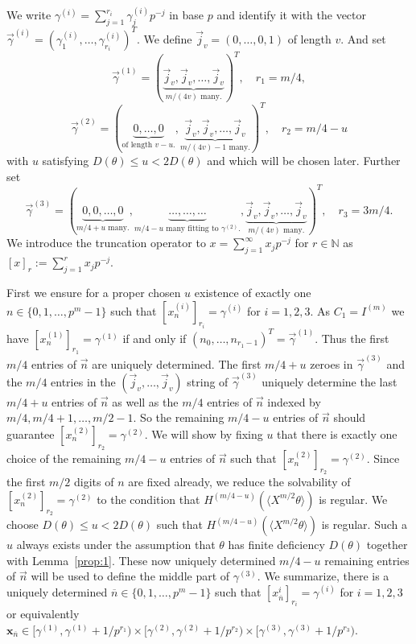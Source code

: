 \documentclass{article}
\newcommand{\bsx}{\boldsymbol{x}}%
\newcommand{\NN}{\mathbb N}
\renewcommand{\(}{\left (}
\renewcommand{\)}{\right )}
\theoremstyle{definition}
\numberwithin{equation}{section}
\begin{document}
We write $\gamma^{(i)}=\sum_{j=1}^{r_i}\gamma_j^{(i)}p^{-j}$ in base $p$ and identify it with the vector $\vec \gamma^{(i)}=(\gamma^{(i)}_1,\ldots,\gamma^{(i)}_{r_i})^T$. 
We define $\vec{j}_v=(0,\ldots,0,1)$ of length $v$. And set 
$$\vec \gamma^{(1)}=(\underbrace{\vec{j}_v,\vec{j}_v,\ldots,\vec{j}_v}_{\mbox{$m/(4v)$ many.}})^T,\quad r_1=m/4,$$
$$\vec \gamma^{(2)}=(\underbrace{0,\ldots,0}_{\mbox{of length $v-u$.}},\underbrace{\vec{j}_v,\vec{j}_v,\ldots,\vec{j}_v}_{\mbox{$m/(4v)-1$ many.}})^T,\quad r_2=m/4-u$$
with $u$ satisfying $D(\theta)\leq u < 2D(\theta)$ and which will be chosen later. Further set 
$$\vec \gamma^{(3)}=(\underbrace{0,0,\ldots,0}_{\mbox{$m/4+u$ many.}},\underbrace{\ldots,\ldots,\ldots}_{\mbox{$m/4-u$ many fitting to $\gamma^{(2)}$.}},\underbrace{\vec{j}_v,\vec{j}_v,\ldots,\vec{j}_v}_{\mbox{$m/(4v)$ many.}})^T,\quad r_3=3m/4.$$ 
We introduce the truncation operator to $x=\sum_{j=1}^{\infty}x_jp^{-j}$ for $r\in\NN$ as $[x]_r:=\sum_{j=1}^{r}x_jp^{-j}$. 

First we ensure for a proper chosen $u$ existence of exactly one $n\in\{0,1,\ldots,p^m-1\}$ such that $[x_n^{(i)}]_{r_i}=\gamma^{(i)}$ for $i=1,2,3$. As $C_1=I^{(m)}$ we have 
$[x_n^{(1)}]_{r_1}=\gamma^{(1)}$ if and only if $(n_0,\ldots,n_{r_1-1})^T=\vec \gamma^{(1)}$. Thus the first $m/4$ entries of $\vec{n}$ are uniquely determined. 
The first $m/4+u$ zeroes in $\vec{\gamma}^{(3)}$ and the $m/4$ entries in the $(\vec{j}_v,\ldots,\vec{j}_v)$ string of $\vec{\gamma}^{(3)}$ uniquely determine the last $m/4+u$ entries of $\vec n$ as well as the $m/4$ entries of $\vec n$ indexed by $m/4,m/4+1,\ldots, m/2-1$. 
So the remaining $m/4-u$ entries of $\vec{n}$ should guarantee $[x^{(2)}_n]_{r_2}=\gamma^{(2)}$. We will show by fixing $u$ that there is exactly one choice of the remaining $m/4-u$ entries of $\vec{n}$ such that $[x^{(2)}_n]_{r_2}=\gamma^{(2)}$. Since the first $m/2$ digits of $n$ are fixed already, we reduce the solvability of $[x^{(2)}_n]_{r_2}=\gamma^{(2)}$ to the condition that $H^{(m/4-u)}(\langle X^{m/2}\theta\rangle)$ is regular. We choose $D(\theta)\leq u <2D(\theta)$ such that $H^{(m/4-u)}(\langle X^{m/2}\theta\rangle)$ is regular. Such a $u$ always exists under the assumption that $\theta$ has finite deficiency $D(\theta)$ together with Lemma~\ref{prop:1}. These now uniquely determined $m/4-u$ remaining entries of $\vec{n}$ will be used to define the middle part of $\gamma^{(3)}$. 
We summarize, there is a uniquely determined ${\overline{n}}\in\{0,1,\ldots,p^m-1\}$ such that $[x_{\overline{n}}^{i}]_{r_i}=\gamma^{(i)}$ for $i=1,2,3$ or equivalently $\bsx_{\overline{n}}\in[\gamma^{(1)},\gamma^{(1)}+1/p^{r_1})\times [\gamma^{(2)},\gamma^{(2)}+1/p^{r_2})\times [\gamma^{(3)},\gamma^{(3)}+1/p^{r_3})$. 
\end{document}

